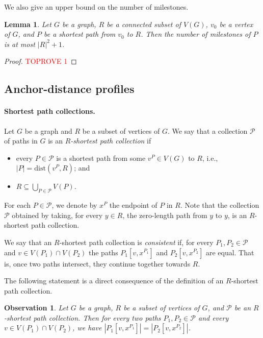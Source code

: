 \documentclass[11pt,a4paper]{article}
\newtheorem{lemma}{Lemma}[section]
\newtheorem{observation}{Observation}[section]
\newcommand{\dist}{\mathrm{dist}}
\begin{document}
We also give an upper bound on the number of milestones.

\begin{lemma}
  \label{lem:mile}
  Let $G$ be a graph, $R$ be a connected subset of $V(G)$, $v_0$ be a vertex of $G$, and $P$ be a shortest path from $v_0$ to $R$. Then the number of milestones of $P$ is at most $|R|^2+1$.
\end{lemma}
\begin{proof}\textcolor{red}{TOPROVE 1}\end{proof}


\subsection{Anchor-distance profiles}
\label{subsec:mdprofiles}

\paragraph{Shortest path collections.}
Let $G$ be a graph and $R$ be a subset of vertices of $G$.
We say that a collection $\mathcal{P}$ of paths in $G$
is an \emph{$R$-shortest path collection} if
\begin{itemize}[nosep]
  \item every $P \in \mathcal{P}$ is a shortest path from some $v^P \in V(G)$ to $R$, i.e., $|P|=\dist(v^P,R)$; and
  \item $R \subseteq \bigcup_{P \in \mathcal{P}} V(P)$.
\end{itemize}

For each $P \in \mathcal{P}$, we denote by $x^P$ the endpoint of $P$ in $R$.
Note that the collection $\mathcal{P}$ obtained by taking, for every $y\in R$, the zero-length path from $y$ to $y$, is an $R$-shortest path collection. 

We say that an $R$-shortest path collection is \emph{consistent} if, for every $P_1,P_2 \in \mathcal{P}$
and $v \in V(P_1) \cap V(P_2)$ the paths $P_1[v,x^{P_1}]$ and $P_2[v,x^{P_2}]$ are equal. That is, 
once two paths intersect, they continue together towards $R$. 

The following statement is a direct consequence of the definition of an $R$-shortest path collection.
\begin{observation}\label{obs:short}
  Let $G$ be a graph, $R$ be a subset of vertices of $G$, and $\mathcal{P}$ be an $R$-shortest path collection. Then for every two paths $P_1,P_2\in \mathcal{P}$ and every $v\in V(P_1)\cap V(P_2)$, we have $|P_1[v,x^{P_1}]|=|P_2[v,x^{P_2}]|$.
\end{observation}
\end{document}
